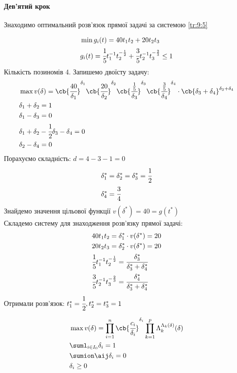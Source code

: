 \paragraph{Дев’ятий крок}
Знаходимо оптимальний розв’язок прямої задачі за системою \eqref{tr:9:5}
\begin{exs}
\begin{eqnarray}
&\min g_i(t) = 40 t_1t_2 + 20t_2t_3\\
&g_i(t) = \cfrac15 t_1^{-1} t_2^{-\frac12}+ \cfrac35 t_2^{-1} t_3^{-\frac23} \leq 1
\end{eqnarray}
Кількість позиномів 4. Запишемо двоїсту задачу:
\begin{eqnarray}
&\max v(\delta) =\cb{\cfrac{40}{\delta_1}}^{\delta_1}\cb{\cfrac{20}{\delta_2}}^{\delta_2}\cb{\cfrac{\frac15}{\delta_3}}^{\delta_3}\cb{\cfrac{\frac35}{\delta_4}}^{\delta_4}\cdot\cb{\delta_3+\delta_4}^{\delta_3+\delta_4}\\
&\delta_1+\delta_2=1\\
&\delta_1 -\delta_3 =0\\
&\delta_1 +\delta_2 - \cfrac12 \delta_3 - \delta_4 = 0\\
&\delta_2 - \delta_4 = 0
\end{eqnarray}
Порахуємо складність: $d=4-3-1=0$\\
\begin{eqnarray}
&\delta_1^\ast = \delta_2^\ast = \delta_3^\ast = \cfrac12\\
&\delta_4^\ast = \cfrac34
\end{eqnarray}
Знайдемо значення цільової функції $v(\delta^\ast) = 40 = g(t^\ast)$\\
Складемо систему для знаходження розв’язку прямої задачі:
\begin{eqnarray}
&40t_1t_2 = \delta_1^\ast \cdot v(\delta^\ast) = 20\\
&20t_2t_3 = \delta_2^\ast \cdot v(\delta^\ast) = 20\\
&\cfrac15 t_1^{-1} t_2^{-\frac12} = \cfrac{\delta_3^\ast}{\delta_3^\ast + \delta_4^\ast}\\
&\cfrac35 t_2^{-1} t_3^{-\frac23} = \cfrac{\delta_4^\ast}{\delta_3^\ast + \delta_4^\ast}\\
\end{eqnarray}
Отримали розв’язок: $t_1^\ast = \cfrac12,t_2^\ast=t_3^\ast = 1$
\end{exs}
\begin{eqnarray}
&\max v(\delta) = \prod\limits_{i=1}^n \cb{\cfrac{c_i}{\delta_i}}^{\delta_i} \prod_{k=1}^p \Lambda_k^{\Lambda_k(\delta)} (\delta)\\
&\suml_{i\in I_0} \delta_i = 1\label{tr:9:5}\\
&\sumion \aij \delta_i = 0\\
&\delta_i \geq 0\label{tr:9:6}
\end{eqnarray}
